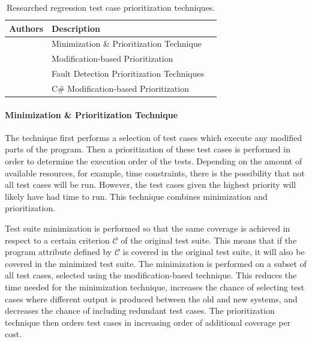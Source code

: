 \documentclass[a4paper,english,12pt]{report}
\begin{document}
\begin{table}[htbp]
  \centering
  \begin{tabular}{|l|l|l|}
    \hline
    \textbf{Authors} & \textbf{Description}\\
    \hline
    \citet{wong1997study} & Minimization \& Prioritization Technique\\
    \hline
    \citet{malhotra2010regression} & Modification-based Prioritization\\
    \hline
    \citet{rothermel1999testcase} & Fault Detection Prioritization Techniques\\
    \hline 
    \citet{mansour2009regression} & C\# Modification-based Prioritization\\
    \hline
  \end{tabular}
  \caption{Researched regression test case prioritization techniques.}
  \label{tab:prioritization-techniques}
\end{table}

\paragraph{Minimization \& Prioritization Technique \citep{wong1997study}} 
The technique first performs a selection of test cases which execute any modified parts of the program. Then a prioritization of these test cases is performed in order to determine the execution order of the tests. Depending on the amount of available resources, for example, time constraints, there is the possibility that not all test cases will be run. However, the test cases given the highest priority will likely have had time to run. This technique combines minimization and prioritization. \citep[p. 264]{wong1997study}

Test suite minimization is performed so that the same coverage is achieved in respect to a certain criterion $\mathcal{C}$ of the original test suite. This means that if the program attribute defined by $\mathcal{C}$ is covered in the original test suite, it will also be covered in the minimized test suite. The minimization is performed on a subset of all test cases, selected using the modification-based technique. This reduces the time needed for the minimization technique, increases the chance of selecting test cases where different output is produced between the old and new systems, and decreases the chance of including redundant test cases. The prioritization technique then orders test cases in increasing order of additional coverage per cost. \citep[p. 265]{wong1997study}
\end{document}
